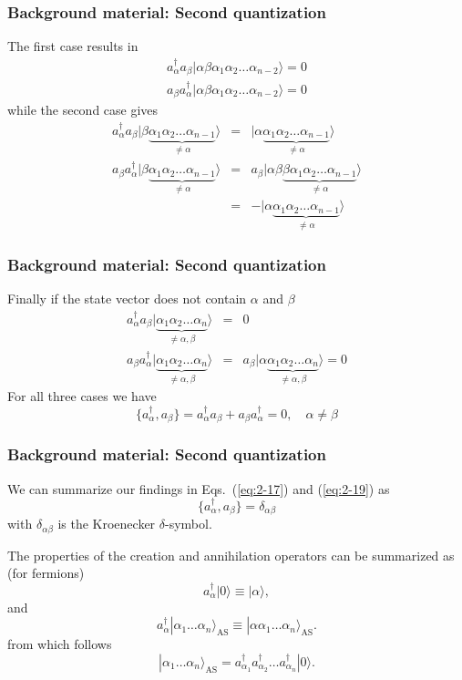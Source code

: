 \documentclass[compress]{beamer}
\newcommand*{\ket}[1]{|#1\rangle}
\begin{document}
{
  \frametitle{Background material: Second quantization}
\begin{small}
{\scriptsize
The first case results in
\begin{eqnarray}
	a_\alpha^\dagger a_\beta \ket{\alpha\beta\alpha_1\alpha_2 \dots \alpha_{n-2}} = 0 \nonumber \\
	a_\beta a_\alpha^\dagger \ket{\alpha\beta\alpha_1\alpha_2 \dots \alpha_{n-2}} = 0 \label{eq:2-18a}
\end{eqnarray}
while the second case gives
\begin{eqnarray}
	 a_\alpha^\dagger a_\beta \ket{\beta \underbrace{\alpha_1\alpha_2 \dots \alpha_{n-1}}_{\neq \alpha}} &=& 
	 	\ket{\alpha \underbrace{\alpha_1\alpha_2 \dots \alpha_{n-1}}_{\neq  \alpha}} \nonumber \\
	a_\beta a_\alpha^\dagger \ket{\beta \underbrace{\alpha_1\alpha_2 \dots \alpha_{n-1}}_{\neq \alpha}} &=&
		a_\beta \ket{\alpha\beta\underbrace{\beta \alpha_1\alpha_2 \dots \alpha_{n-1}}_{\neq \alpha}} \nonumber \\
	&=& - \ket{\alpha\underbrace{\alpha_1\alpha_2 \dots \alpha_{n-1}}_{\neq \alpha}} \label{eq:2-18b}
\end{eqnarray}
}
\end{small}
}
\frame
{
  \frametitle{Background material: Second quantization}
\begin{small}
{\scriptsize
Finally if the state vector does not contain $\alpha$ and $\beta$
\begin{eqnarray}
	a_\alpha^\dagger a_\beta \ket{\underbrace{\alpha_1\alpha_2 \dots \alpha_{n}}_{\neq \alpha,\beta}} &=& 0 \nonumber \\
	a_\beta a_\alpha^\dagger \ket{\underbrace{\alpha_1\alpha_2 \dots \alpha_{n}}_{\neq \alpha,\beta}} &=& 
		a_\beta \ket{\alpha \underbrace{\alpha_1\alpha_2 \dots \alpha_{n}}_{\neq \alpha,\beta}} = 0 \label{eq:2-18c}
\end{eqnarray}
For all three cases we have
\begin{equation}
	\{a_\alpha^\dagger,a_\beta \} = a_\alpha^\dagger a_\beta + a_\beta a_\alpha^\dagger = 0, \quad \alpha \neq \beta \label{eq:2-19}
\end{equation}
}
\end{small}
}
\frame
{
  \frametitle{Background material: Second quantization}
\begin{small}
{\scriptsize
We can summarize  our findings in Eqs.~(\ref{eq:2-17}) and (\ref{eq:2-19}) as 
\begin{equation}
	\{a_\alpha^\dagger,a_\beta \} = \delta_{\alpha\beta} \label{eq:2-20}
\end{equation}
with  $\delta_{\alpha\beta}$ is the Kroenecker $\delta$-symbol.

The properties of the creation and annihilation operators can be summarized as (for fermions)
\[
	a_\alpha^\dagger\ket{0} \equiv  \ket{\alpha},
\]
and 
\[
	a_\alpha^\dagger\ket{\alpha_1\dots \alpha_n}_{\mathrm{\mathrm{AS}}} \equiv  \ket{\alpha\alpha_1\dots \alpha_n}_{\mathrm{\mathrm{AS}}}. 
\]
from which follows
\[
        \ket{\alpha_1\dots \alpha_n}_{\mathrm{\mathrm{AS}}} = a_{\alpha_1}^\dagger a_{\alpha_2}^\dagger \dots a_{\alpha_n}^\dagger \ket{0}.
\]
}
\end{small}
}
\end{document}
